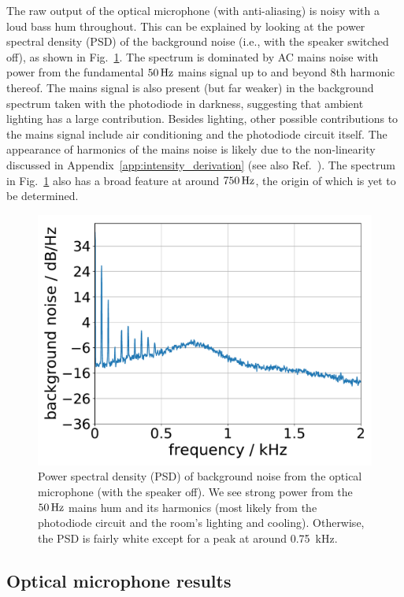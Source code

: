 \documentclass[paper-main.tex]{subfiles}
\begin{document}
The raw output of the optical microphone (with anti-aliasing) is noisy with a loud bass hum throughout. 
This can be explained by looking at the power spectral density (PSD) of the background noise (i.e., with the speaker switched off), as shown in Fig.~\ref{fig:psd_noise}. 
The spectrum is dominated by AC mains noise with power from the fundamental $50\,{\rm Hz}$ mains signal up to and beyond $8$th harmonic thereof. 
The mains signal is also present (but far weaker) in the background spectrum taken with the photodiode in darkness, suggesting that ambient lighting has a large contribution. 
Besides lighting, other possible contributions to the mains signal include air conditioning and the photodiode circuit itself. 
The appearance of harmonics of the mains noise is likely due to the non-linearity discussed in Appendix~\ref{app:intensity_derivation} (see also Ref.~\cite{feynman}). 
The spectrum in Fig.~\ref{fig:psd_noise} also has a broad feature at around $750\,{\rm Hz}$, the origin of which is yet to be determined.


\begin{figure}
	\includegraphics[width=.45\textwidth]{figures/psd_podo_14_6.pdf}
	\caption{\label{fig:psd_noise}
Power spectral density (PSD) of background noise from the optical microphone (with the speaker off). 
We see strong power from the $50\,{\rm Hz}$ mains hum and its harmonics (most likely from the photodiode circuit and the room’s lighting and cooling). Otherwise, the PSD is fairly white except for a peak at around 0.75~kHz. 
}
\end{figure}


\subsection{Optical microphone results}
\label{sec:opticalMicResults}
\end{document}
